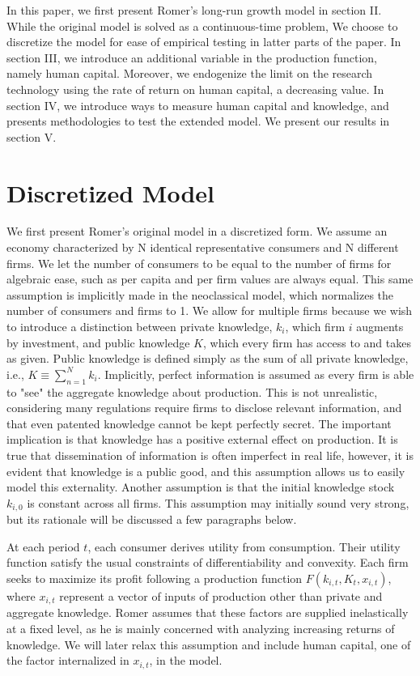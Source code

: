 \documentclass{article}
\begin{document}
In this paper, we first present Romer's long-run growth model in section II. While the original model is solved as a continuous-time problem, We choose to discretize the model for ease of empirical testing in latter parts of the paper. In section III, we introduce an additional variable in the production function, namely human capital. Moreover, we endogenize the limit on the research technology using the rate of return on human capital, a decreasing value. In section IV, we introduce ways to measure human capital and knowledge, and presents methodologies to test the extended model. We present our results in section V.
 
\section{Discretized Model}

We first present Romer's original model in a discretized form. We assume an economy characterized by N identical representative consumers and N different firms. We let the number of consumers to be equal to the number of firms for algebraic ease, such as per capita and per firm values are always equal. This same assumption is implicitly made in the neoclassical model, which normalizes the number of consumers and firms to 1. We allow for multiple firms because we wish to introduce a distinction between private knowledge, $k_i$, which firm $i$ augments by investment, and public knowledge $K$, which every firm has access to and takes as given. Public knowledge is defined simply as the sum of all private knowledge, i.e., $K \equiv \sum\limits_{n=1}^{N} k_i$. Implicitly, perfect information is assumed as every firm is able to "see" the aggregate knowledge about production. This is not unrealistic, considering many regulations require firms to disclose relevant information, and that even patented knowledge cannot be kept perfectly secret. The important implication is that knowledge has a positive external effect on production. It is true that dissemination of information is often imperfect in real life, however, it is evident that knowledge is a public good, and this assumption allows us to easily model this externality. Another assumption is that the initial knowledge stock $k_{i,0}$ is constant across all firms. This assumption may initially sound very strong, but its rationale will be discussed a few paragraphs below. 

At each period $t$, each consumer derives utility from consumption. Their utility function satisfy the usual constraints of differentiability and convexity. Each firm seeks to maximize its profit following a production function $F(k_{i,t},K_t,x_{i,t})$, where $x_{i,t}$ represent a vector of inputs of production other than private and aggregate knowledge. Romer assumes that these factors are supplied inelastically at a fixed level, as he is mainly concerned with analyzing increasing returns of knowledge. We will later relax this assumption and include human capital, one of the factor internalized in $x_{i,t}$, in the model. 
\end{document}
